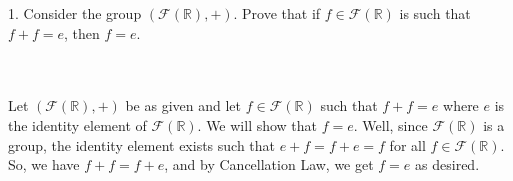 1. Consider the group $(\mathcal{F}(\mathbb{R}),+)$. Prove that if $f\in\mathcal{F}(\mathbb{R})$ is such
that $f+f=e$, then $f=e$.\\\\

\begin{solution}\renewcommand{\qedsymbol}{}\ \\
    Let $(\mathcal{F}(\mathbb{R}),+)$ be as given and let $f\in\mathcal{F}(\mathbb{R})$ such that
    $f+f=e$ where $e$ is the identity element of $\mathcal{F}(\mathbb{R})$. We will show that $f=e$.
    Well, since $\mathcal{F}(\mathbb{R})$ is a group, the identity element exists such that $e+f=f+e=f$
    for all $f\in\mathcal{F}(\mathbb{R})$. So, we have $f+f=f+e$, and by Cancellation Law, we get $f=e$
    as desired.

\end{solution}